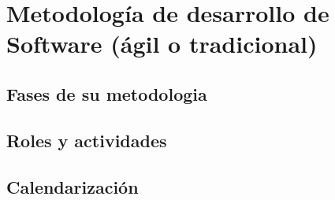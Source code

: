 \section{Metodología de desarrollo de Software (ágil o tradicional)}

\subsection{Fases de su metodologia}

\subsection{Roles y actividades}

\subsection{Calendarización}